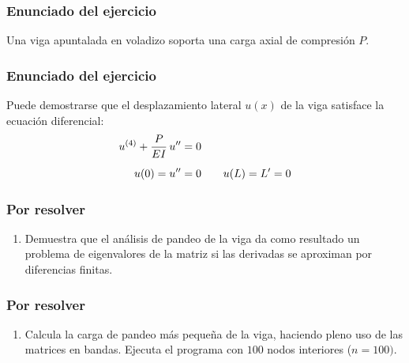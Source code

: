 \documentclass[12pt]{beamer}
\begin{document}
\begin{frame}
\frametitle{Enunciado del ejercicio}
Una viga apuntalada en voladizo soporta una carga axial de compresión $P$.
\begin{figure}
    \centering
\end{figure}
\end{frame}
\begin{frame}
\frametitle{Enunciado del ejercicio}
Puede demostrarse que el desplazamiento lateral $u (x)$ de la viga satisface la ecuación diferencial:
\pause
\begin{align}
{u}^{(4)} + \dfrac{P}{E I} \, {u}^{\prime \prime} &= 0 \label{eq:ecuacion_09_06_a} \\[0.5em]
u (0) = {u}^{\prime \prime} &= 0 \hspace{0.7cm} u (L) = {L}^{\prime} = 0 \label{eq:ecuacion_09_06_b}
\end{align}
\end{frame}
\begin{frame}
\frametitle{Por resolver}
\begin{enumerate}
\item Demuestra que el análisis de pandeo de la viga da como resultado un problema de eigenvalores de la matriz si las derivadas se aproximan por diferencias finitas.
\conti
\end{enumerate}
\end{frame}
\begin{frame}
\frametitle{Por resolver}
\begin{enumerate}
\seti
\item Calcula la carga de pandeo más pequeña de la viga, haciendo pleno uso de las matrices en bandas. Ejecuta el programa con $100$ nodos interiores ($n = 100)$.
\end{enumerate}
\end{frame}
\end{document}
